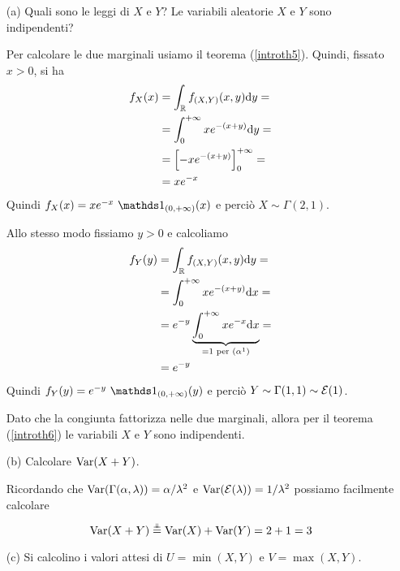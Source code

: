 \Soluzione{}
\begin{enumerate}
\item [(a)] Quali sono le leggi di $X$ e $Y$? Le variabili aleatorie $X$ e $Y$ sono indipendenti?

Per calcolare le due marginali usiamo il teorema (\ref{introth5}). Quindi, fissato $x>0$, si ha
\begin{gather*}
\begin{aligned}
f_X(x)&=\int_{\mathbb{R}}f_{(X,Y)}(x,y)\mathrm{d} y=\\
&=\int_{0}^{+\infty} xe^{-(x+y)}\mathrm{d} y=\\
&=\left[-xe^{-(x+y)}  \right]_0^{+\infty}=\\
&=xe^{-x}
\end{aligned}
\end{gather*}
Quindi $f_X(x)=xe^{-x}\ \Ind_{(0,+\infty)}(x)$ e perciò $X\sim\Gamma(2,1)$.

Allo stesso modo fissiamo $y>0$ e calcoliamo
\begin{gather*}
\begin{aligned}
f_Y(y)&=\int_{\mathbb{R}}f_{(X,Y)}(x,y)\mathrm{d} y=\\
&=\int_{0}^{+\infty} xe^{-(x+y)}\mathrm{d} x=\\
&=e^{-y}\underbrace{\int_{0}^{+\infty} xe^{-x}\mathrm{d} x}_{=1\text{ per }(\alpha^1)}=\\
&=e^{-y}
\end{aligned}
\end{gather*}
Quindi $f_Y(y)=e^{-y}\ \Ind_{(0,+\infty)}(y)$ e perciò $Y\sim\Gamma(1,1)\sim\mathcal{E}(1)$.

Dato che la congiunta fattorizza nelle due marginali, allora per il teorema (\ref{introth6}) le variabili $X$ e $Y$ sono indipendenti.
\item [(b)] Calcolare $\operatorname{Var}(X+Y)$.

Ricordando che $\operatorname{Var}(\Gamma(\alpha,\lambda))=\alpha/\lambda^2$ e $\operatorname{Var}(\mathcal{E}(\lambda))=1/\lambda^2$ possiamo facilmente calcolare
\[
\operatorname{Var}(X+Y)\overset{\underset{\perp \!\!\! \perp}{}}{=}\operatorname{Var}(X)+\operatorname{Var}(Y)=2+1=3
\]
\item [(c)] Si calcolino i valori attesi di $U=\min(X,Y)$ e $V=\max(X,Y)$.


\end{enumerate}
